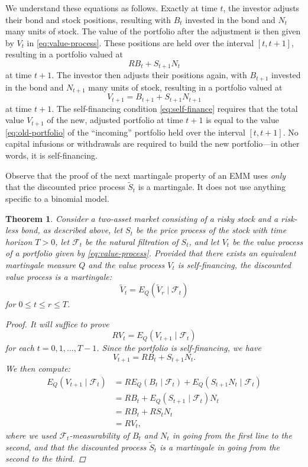 \documentclass[11pt, openany, oneside]{book}
\newtheorem{thm}{Theorem}[section]
\theoremstyle{definition}
\theoremstyle{remark}
\theoremstyle{boldital}
\numberwithin{equation}{section}
\begin{document}
We understand these equations as follows. Exactly at time $t$, the investor adjusts their bond and stock positions, resulting with $B_t$ invested in the bond and $N_t$ many units of stock. The value of the portfolio after the adjustment is then given by $V_t$ in \eqref{eq:value-process}. These positions are held over the interval $[t,t+1]$, resulting in a portfolio valued at
	\begin{equation}\label{eq:old-portfolio}
	RB_t + S_{t+1}N_t
	\end{equation}
at time $t+1$. The investor then adjusts their positions again, with $B_{t+1}$ invested in the bond and $N_{t+1}$ many units of stock, resulting in a portfolio valued at
	\[
	V_{t+1} = B_{t+1} + S_{t+1} N_{t+1}
	\]
at time $t+1$. The self-financing condition \eqref{eq:self-finance} requires that the total value $V_{t+1}$ of the new, adjusted portfolio at time $t+1$ is equal to the value \eqref{eq:old-portfolio} of the ``incoming'' portfolio held over the interval $[t,t+1]$. No capital infusions or withdrawals are required to build the new portfolio---in other words, it is self-financing.

Observe that the proof of the next martingale property of an EMM uses \textit{only} that the discounted price process $\tilde{S}_t$ is a martingale. It does not use anything specific to a binomial model.

\begin{thm}\label{thm:value-process-martingale}
Consider a two-asset market consisting of a risky stock and a risk-less bond, as described above, let $S_t$ be the price process of the stock with time horizon $T>0$, let $\mathcal{F}_t$ be the natural filtration of $S_t$, and let $V_t$ be the value process of a portfolio given by \eqref{eq:value-process}. Provided that there exists an equivalent martingale measure $Q$ and the value process $V_t$ is self-financing, the discounted value process is a martingale:
	\[
	\tilde{V}_t = E_Q ( \tilde{V}_r \mid \mathcal{F}_t )
	\]
for $0 \leq t \leq r \leq T$.

\begin{proof}
It will suffice to prove
	\[
	RV_t = E_Q\left( V_{t+1} \mid \mathcal{F}_t \right)
	\]
for each $t=0,1,\ldots,T-1$. Since the portfolio is self-financing, we have
	\[
	V_{t+1} = R B_t + S_{t+1} N_t.
	\]
We then compute:
	\begin{align*}
	E_Q\left( V_{t+1} \mid \mathcal{F}_t \right) &= RE_Q(B_t \mid \mathcal{F}_t) + E_Q(S_{t+1}N_t \mid \mathcal{F}_t) \\
	&= RB_t + E_Q(S_{t+1} \mid \mathcal{F}_t) N_t \\
	&= RB_t + RS_t N_t \\
	&= R V_t,
	\end{align*}
where we used $\mathcal{F}_t$-measurability of $B_t$ and $N_t$ in going from the first line to the second, and that the discounted process $\tilde{S}_t$ is a martingale in going from the second to the third.
\end{proof}
\end{thm}
\end{document}
